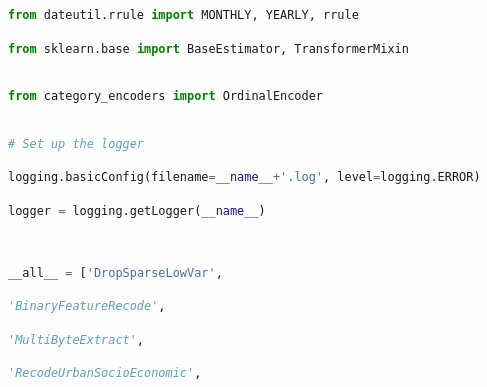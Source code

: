 \documentclass[
  11pt,
  a4paper,
  DIV=12,captions=tableheading,oneside]{scrbook}
\begin{document}
\begin{lstlisting}[language=Python,stepnumber=2,basicstyle=\footnotesize]
from dateutil.rrule import MONTHLY, YEARLY, rrule\end{lstlisting}
\begin{lstlisting}[language=Python,stepnumber=2,basicstyle=\footnotesize]
from sklearn.base import BaseEstimator, TransformerMixin\end{lstlisting}
\begin{lstlisting}[language=Python,stepnumber=2,basicstyle=\footnotesize]
\end{lstlisting}
\begin{lstlisting}[language=Python,stepnumber=2,basicstyle=\footnotesize]
from category_encoders import OrdinalEncoder\end{lstlisting}
\begin{lstlisting}[language=Python,stepnumber=2,basicstyle=\footnotesize]
\end{lstlisting}
\begin{lstlisting}[language=Python,stepnumber=2,basicstyle=\footnotesize]
# Set up the logger\end{lstlisting}
\begin{lstlisting}[language=Python,stepnumber=2,basicstyle=\footnotesize]
logging.basicConfig(filename=__name__+'.log', level=logging.ERROR)\end{lstlisting}
\begin{lstlisting}[language=Python,stepnumber=2,basicstyle=\footnotesize]
logger = logging.getLogger(__name__)\end{lstlisting}
\begin{lstlisting}[language=Python,stepnumber=2,basicstyle=\footnotesize]
\end{lstlisting}
\begin{lstlisting}[language=Python,stepnumber=2,basicstyle=\footnotesize]
\end{lstlisting}
\begin{lstlisting}[language=Python,stepnumber=2,basicstyle=\footnotesize]
__all__ = ['DropSparseLowVar',\end{lstlisting}
\begin{lstlisting}[language=Python,stepnumber=2,basicstyle=\footnotesize]
           'BinaryFeatureRecode',\end{lstlisting}
\begin{lstlisting}[language=Python,stepnumber=2,basicstyle=\footnotesize]
           'MultiByteExtract',\end{lstlisting}
\begin{lstlisting}[language=Python,stepnumber=2,basicstyle=\footnotesize]
           'RecodeUrbanSocioEconomic',\end{lstlisting}
\end{document}
